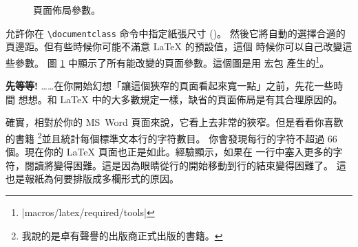 \begin{figure}[!hp]
\begin{center}
\makeatletter\@mylayout\makeatother
\end{center}
\vspace*{1.8cm}
\caption{頁面佈局參數。}
\label{fig:layout}
\end{figure}
\LaTeXe{} 允許你在 \verb|\documentclass| 命令中指定紙張尺寸 ()。
然後它將自動的選擇合適的頁邊距。但有些時候你可能不滿意 \LaTeX{} 的預設值，這個
時候你可以自己改變這些參數。
\thispagestyle{fancyplain}
圖 \ref{fig:layout} 中顯示了所有能改變的頁面參數。這個圖是用  宏包
產生的\footnote{\CTANref|macros/latex/required/tools|}。

\textbf{先等等!} ……在你開始幻想「讓這個狹窄的頁面看起來寬一點」之前，先花一些時間
想想。和 \LaTeX{} 中的大多數規定一樣，缺省的頁面佈局是有其合理原因的。

確實，相對於你的 MS\ Word 頁面來說，它看上去非常的狹窄。但是看看你喜歡的書籍
\footnote{我說的是卓有聲譽的出版商正式出版的書籍。}並且統計每個標準文本行的字符數目。
你會發現每行的字符不超過 66 個。現在你的 \LaTeX{} 頁面也正是如此。經驗顯示，如果在
一行中塞入更多的字符，閱讀將變得困難。這是因為眼睛從行的開始移動到行的結束變得困難了。
這也是報紙為何要排版成多欄形式的原因。

